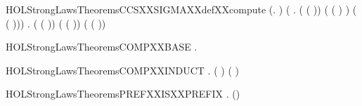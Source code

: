 \newcommand{\HOLStrongLawsTheoremsCCSXXCOMPXXdefXXcompute}{\UseVerbatim{HOLStrongLawsTheoremsCCSXXCOMPXXdefXXcompute}}
\begin{SaveVerbatim}{HOLStrongLawsTheoremsCCSXXSIGMAXXdefXXcompute}
\HOLTokenTurnstile{} (\HOLSymConst{\HOLTokenForall{}}.    \HOLSymConst{=}  ) \HOLSymConst{\HOLTokenConj{}}
   (\HOLSymConst{\HOLTokenForall{}} .
          ( ( )) \HOLSymConst{=}
          ( ( ) \HOLSymConst{-} ) \HOLSymConst{+}  ( ( ))) \HOLSymConst{\HOLTokenConj{}}
   \HOLSymConst{\HOLTokenForall{}} .
         ( ( )) \HOLSymConst{=}
         ( ( )) \HOLSymConst{+}  ( ( ))
\end{SaveVerbatim}
\newcommand{\HOLStrongLawsTheoremsCCSXXSIGMAXXdefXXcompute}{\UseVerbatim{HOLStrongLawsTheoremsCCSXXSIGMAXXdefXXcompute}}
\begin{SaveVerbatim}{HOLStrongLawsTheoremsCOMPXXBASE}
\HOLTokenTurnstile{} \HOLSymConst{\HOLTokenForall{}}.    \HOLSymConst{=}  
\end{SaveVerbatim}
\newcommand{\HOLStrongLawsTheoremsCOMPXXBASE}{\UseVerbatim{HOLStrongLawsTheoremsCOMPXXBASE}}
\begin{SaveVerbatim}{HOLStrongLawsTheoremsCOMPXXINDUCT}
\HOLTokenTurnstile{} \HOLSymConst{\HOLTokenForall{}} .   ( ) \HOLSymConst{=}    \HOLSymConst{\ensuremath{\parallel}}  ( )
\end{SaveVerbatim}
\newcommand{\HOLStrongLawsTheoremsCOMPXXINDUCT}{\UseVerbatim{HOLStrongLawsTheoremsCOMPXXINDUCT}}
\begin{SaveVerbatim}{HOLStrongLawsTheoremsPREFXXISXXPREFIX}
\HOLTokenTurnstile{} \HOLSymConst{\HOLTokenForall{}} .  ()
\end{SaveVerbatim}
